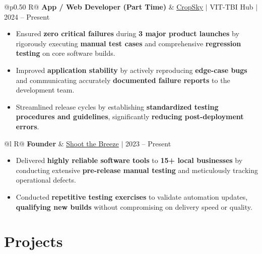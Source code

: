 \documentclass[a4paper,10pt]{article}
\newcommand{\ulink}[2]{\href{#1}{\uline{#2}}}
\newcommand{\subheading}[1]{{\color[HTML]{0A0A0A}\fontsize{12}{14}\selectfont\bfseries #1}}
\newcommand{\meta}[1]{{\color[HTML]{5C5C5C}\fontsize{10.5}{12.5}\selectfont #1}}
\begin{document}
\begin{tabularx}{\linewidth}{@{}p{0.50\linewidth} R@{}}
\subheading{App / Web Developer (Part Time)} & \meta{\ulink{https://sites.google.com/view/cropsky/home}{CropSky} $|$ VIT-TBI Hub $|$ 2024 -- Present}
\end{tabularx}
\begin{itemize}[nosep, leftmargin=1.5em, itemsep=1pt, topsep=2pt]
  \item {\color[HTML]{0A0A0A}\fontsize{11}{14}\selectfont Ensured \textbf{zero critical failures} during \textbf{3 major product launches} by rigorously executing \textbf{manual test cases} and comprehensive \textbf{regression testing} on core software builds.}
  \item {\color[HTML]{0A0A0A}\fontsize{11}{14}\selectfont Improved \textbf{application stability} by actively reproducing \textbf{edge-case bugs} and communicating accurately \textbf{documented failure reports} to the development team.}
  \item {\color[HTML]{0A0A0A}\fontsize{11}{14}\selectfont Streamlined release cycles by establishing \textbf{standardized testing procedures and guidelines}, significantly \textbf{reducing post-deployment errors}.}
\end{itemize}

\vspace{2pt}

\begin{tabularx}{\linewidth}{@{}l R@{}}
\subheading{Founder} & \meta{\ulink{https://shoot-the-breeze.vercel.app}{Shoot the Breeze} $|$ 2023 -- Present}
\end{tabularx}
\begin{itemize}[nosep, leftmargin=1.5em, itemsep=1pt, topsep=2pt]
  \item {\color[HTML]{0A0A0A}\fontsize{11}{14}\selectfont Delivered \textbf{highly reliable software tools} to \textbf{15+ local businesses} by conducting extensive \textbf{pre-release manual testing} and meticulously tracking operational defects.}
  \item {\color[HTML]{0A0A0A}\fontsize{11}{14}\selectfont Conducted \textbf{repetitive testing exercises} to validate automation updates, \textbf{qualifying new builds} without compromising on delivery speed or quality.}
\end{itemize}

\vspace{2pt}

\section{Projects}
\vspace{2pt}
\end{document}
